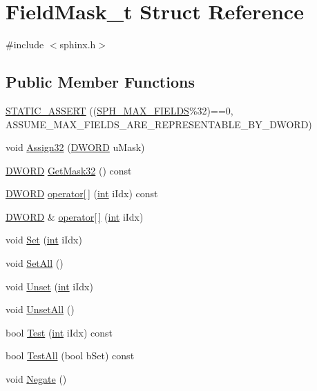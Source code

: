 \hypertarget{structFieldMask__t}{\section{Field\-Mask\-\_\-t Struct Reference}
\label{structFieldMask__t}
}


{\ttfamily \#include $<$sphinx.\-h$>$}

\subsection*{Public Member Functions}
\begin{DoxyCompactItemize}
\item 
\hyperlink{structFieldMask__t_ac6301be7218dfa1db237f3ff514a8510}{S\-T\-A\-T\-I\-C\-\_\-\-A\-S\-S\-E\-R\-T} ((\hyperlink{sphinx_8h_ad5336c1a92b4f76b012a1a868a85b874}{S\-P\-H\-\_\-\-M\-A\-X\-\_\-\-F\-I\-E\-L\-D\-S}\%32)==0, A\-S\-S\-U\-M\-E\-\_\-\-M\-A\-X\-\_\-\-F\-I\-E\-L\-D\-S\-\_\-\-A\-R\-E\-\_\-\-R\-E\-P\-R\-E\-S\-E\-N\-T\-A\-B\-L\-E\-\_\-\-B\-Y\-\_\-\-D\-W\-O\-R\-D)
\item 
void \hyperlink{structFieldMask__t_a224c76722b0d3ade81b8dbdb9cf90ff4}{Assign32} (\hyperlink{sphinxstd_8h_a798af1e30bc65f319c1a246cecf59e39}{D\-W\-O\-R\-D} u\-Mask)
\item 
\hyperlink{sphinxstd_8h_a798af1e30bc65f319c1a246cecf59e39}{D\-W\-O\-R\-D} \hyperlink{structFieldMask__t_a373fdc594a27b3b4ec6a7957e34498ac}{Get\-Mask32} () const 
\item 
\hyperlink{sphinxstd_8h_a798af1e30bc65f319c1a246cecf59e39}{D\-W\-O\-R\-D} \hyperlink{structFieldMask__t_a35d3c8b5744743a7dccc3ebe1965af08}{operator\mbox{[}$\,$\mbox{]}} (\hyperlink{sphinxexpr_8cpp_a4a26e8f9cb8b736e0c4cbf4d16de985e}{int} i\-Idx) const 
\item 
\hyperlink{sphinxstd_8h_a798af1e30bc65f319c1a246cecf59e39}{D\-W\-O\-R\-D} \& \hyperlink{structFieldMask__t_a590bba05cc2f137f1614b1f8e7283f8b}{operator\mbox{[}$\,$\mbox{]}} (\hyperlink{sphinxexpr_8cpp_a4a26e8f9cb8b736e0c4cbf4d16de985e}{int} i\-Idx)
\item 
void \hyperlink{structFieldMask__t_a15b27a3f0812f441275526365b91ac48}{Set} (\hyperlink{sphinxexpr_8cpp_a4a26e8f9cb8b736e0c4cbf4d16de985e}{int} i\-Idx)
\item 
void \hyperlink{structFieldMask__t_aebbe8920b8288c36724a9d12698e4bee}{Set\-All} ()
\item 
void \hyperlink{structFieldMask__t_ace8bc10b68d490fa65664dcdaaa41bc5}{Unset} (\hyperlink{sphinxexpr_8cpp_a4a26e8f9cb8b736e0c4cbf4d16de985e}{int} i\-Idx)
\item 
void \hyperlink{structFieldMask__t_a2e4d9f2511e5d1b7e2766c942f65d645}{Unset\-All} ()
\item 
bool \hyperlink{structFieldMask__t_ae4e7be24a6a6f5183a6b8faa1c403c7f}{Test} (\hyperlink{sphinxexpr_8cpp_a4a26e8f9cb8b736e0c4cbf4d16de985e}{int} i\-Idx) const 
\item 
bool \hyperlink{structFieldMask__t_a5c2cc02cf9cee6e7f049e90f4fe3b57f}{Test\-All} (bool b\-Set) const 
\item 
void \hyperlink{structFieldMask__t_a15a5bb94794fccb3d4954f53e1906b27}{Negate} ()
\end{DoxyCompactItemize}
